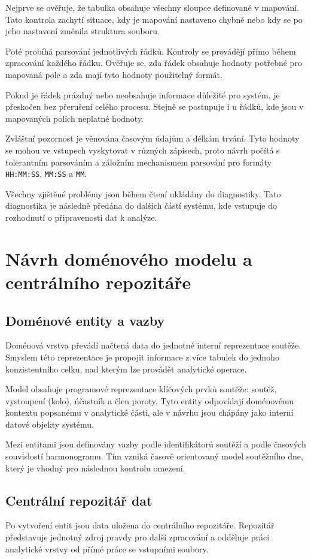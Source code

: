 \documentclass[czech, kiv, ba, he, iso690alph, pdf]{fasthesis}
\begin{document}
				Nejprve se ověřuje, že tabulka obsahuje všechny sloupce definované v mapování. Tato kontrola zachytí situace, kdy je mapování nastaveno chybně nebo kdy se po jeho nastavení změnila struktura souboru.
	
				Poté probíhá parsování jednotlivých řádků. Kontroly se provádějí přímo během zpracování každého řádku. Ověřuje se, zda řádek obsahuje hodnoty potřebné pro mapovaná pole a zda mají tyto hodnoty použitelný formát.
	
				Pokud je řádek prázdný nebo neobsahuje informace důležité pro systém, je přeskočen bez přerušení celého procesu. Stejně se postupuje i u řádků, kde jsou v mapovaných polích neplatné hodnoty.
	
				Zvláštní pozornost je věnována časovým údajům a délkám trvání. Tyto hodnoty se mohou ve vstupech vyskytovat v různých zápisech, proto návrh počítá s tolerantním parsováním a záložním mechanismem parsování pro formáty \texttt{HH:MM:SS}, \texttt{MM:SS} a \texttt{MM}.
	
				Všechny zjištěné problémy jsou během čtení ukládány do diagnostiky. Tato diagnostika je následně předána do dalších částí systému, kde vstupuje do rozhodnutí o připravenosti dat k analýze.
	
		\section{Návrh doménového modelu a centrálního repozitáře}
	
			\subsection{Doménové entity a vazby}
				Doménová vrstva převádí načtená data do jednotné interní reprezentace soutěže. Smyslem této reprezentace je propojit informace z více tabulek do jednoho konzistentního celku, nad kterým lze provádět analytické operace.
	
				Model obsahuje programové reprezentace klíčových prvků soutěže: soutěž, vystoupení (kolo), účastník a člen poroty. Tyto entity odpovídají doménovému kontextu popsanému v analytické části, ale v návrhu jsou chápány jako interní datové objekty systému.
	
				Mezi entitami jsou definovány vazby podle identifikátorů soutěží a podle časových souvislostí harmonogramu. Tím vzniká časově orientovaný model soutěžního dne, který je vhodný pro následnou kontrolu omezení.
	
			\subsection{Centrální repozitář dat}
				Po vytvoření entit jsou data uložena do centrálního repozitáře. Repozitář představuje jednotný zdroj pravdy pro další zpracování a odděluje práci analytické vrstvy od přímé práce se vstupními soubory.
	
\end{document}
